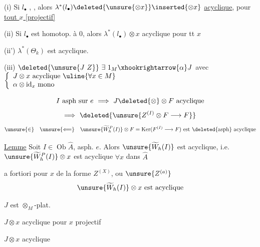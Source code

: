 

(i) Si $l_\bullet$ ,
, alors
$\lambda^*(l_\bullet)\deleted{\unsure{\otimes x}}\inserted{\otimes x}$
 \uline{acyclique}, pour \uline{tout $x$ [projectif]}

(ii) Si $l_\bullet$ est homotop. à $0$, alors $\lambda^*(l_\bullet)\otimes x$
acyclique pour tt $x$

(ii') $\lambda^*(\Theta_k)$ est acyclique.

(iii) $\deleted{\unsure{J\ Z}}\ \exists\ 1_M\xhookrightarrow{\alpha}J$
avec $\left\{\begin{array}{l}J\otimes x\text{ acyclique }\uline{\forall x\in M}\\
\alpha\otimes\mathrm{id}_x\text{ mono}\end{array}\right.$

\[
I\text{ asph sur }e\ \Longrightarrow\ J\deleted{\otimes}\otimes F\text{ acyclique}
\]
\[
\Longrightarrow\ \deleted{\unsure{Z^{(I)}\otimes F\longrightarrow F}}
\]
\[
\unsure{\in}\quad \unsure{\Longleftarrow}\quad
\unsure{\widetilde W_h^P(I)}\otimes F=\operatorname{Ker}(F^{(I)}\longrightarrow F)
\text{ est \deleted{asph} acyclique}
\]

\uline{Lemme} Soit $I\in\operatorname{Ob}\widehat A$, asph.  $e$.
Alors $\unsure{\widetilde W_h(I)}$ est  acyclique,
i.e. $\unsure{\widetilde W_h^P(I)}\otimes x$ est acyclique $\forall x$ dans $\widehat A$

a fortiori pour $x$ de la forme $Z^{(X)}$, ou $\unsure{Z^{(a)}}$
\[
\unsure{\widetilde W_h(I)}\otimes x\text{ est acyclique}
\]

$J$ est $\otimes_M$-plat.

$J\otimes x$ acyclique pour $x$ projectif

$J\otimes x$ acyclique

